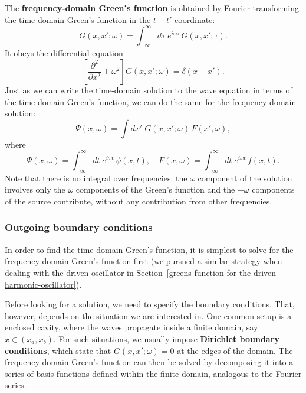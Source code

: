 \documentclass[10pt,a4paper]{article}
\begin{document}
The \textbf{frequency-domain Green's function} is obtained by Fourier
transforming the time-domain Green's function in the $t-t'$
coordinate:
\begin{equation}
G(x,x';\omega) = \int_{-\infty}^\infty d\tau\; e^{i\omega \tau}\, G(x,x'; \tau).
\end{equation}
It obeys the differential equation
\begin{equation}
\left[\frac{\partial^2}{\partial x^2} + \omega^2 \right] G(x,x';\omega) = \delta(x-x').
\end{equation}
Just as we can write the time-domain solution to the wave equation in
terms of the time-domain Green's function, we can do the same for the
frequency-domain solution:
\begin{equation}
\Psi(x,\omega) = \int dx' \; G(x,x';\omega) \, F(x', \omega),
\end{equation}
where
\begin{equation}
\Psi(x,\omega) = \int_{-\infty}^\infty dt \; e^{i\omega t} \, \psi(x,t), \quad F(x,\omega) = \int_{-\infty}^\infty dt \; e^{i\omega t} \, f(x,t).
\end{equation}
Note that there is no integral over frequencies: the $\omega$
component of the solution involves only the $\omega$ components of the
Green's function and the $-\omega$ components of the source
contribute, without any contribution from other frequencies.

\subsubsection{Outgoing boundary conditions}
\label{outgoing-boundary-conditions}

In order to find the time-domain Green's function, it is simplest to
solve for the frequency-domain Green's function first (we pursued a
similar strategy when dealing with the driven oscillator in
Section~\ref{greens-function-for-the-driven-harmonic-oscillator}).

Before looking for a solution, we need to specify the boundary
conditions. That, however, depends on the situation we are interested
in. One common setup is a enclosed cavity, where the waves propagate
inside a finite domain, say $x \in (x_a,x_b)$. For such situations, we
usually impose \textbf{Dirichlet boundary conditions}, which state
that $G(x,x';\omega) = 0$ at the edges of the domain. The
frequency-domain Green's function can then be solved by decomposing it
into a series of basis functions defined within the finite domain,
analogous to the Fourier series.
\end{document}
